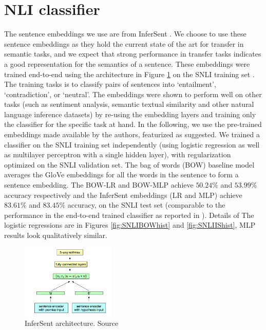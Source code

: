 \documentclass[10pt,letterpaper]{article}
\begin{document}
\section{NLI classifier}
The sentence embeddings we use are from InferSent \citep{Conneau:2017uf}. We choose to use these sentence embeddings as they hold the current state of the art for transfer in semantic tasks, and we expect that strong performance in transfer tasks indicates a good representation for the semantics of a sentence. These embeddings were trained end-to-end using the architecture in Figure \ref{fig:arch} on the SNLI training set \citep{snli:emnlp2015}. The training tasks is to classify pairs of sentences into `entailment', `contradiction', or `neutral'. The embeddings were shown to perform well on other tasks (such as sentiment analysis, semantic textual similarity and other natural language inference datasets) by re-using the embedding layers and training only the classifier for the specific task at hand. In the following, we use the pre-trained embeddings made available by the authors, featurized as suggested. We trained a classifier on the SNLI training set independently (using logistic regression as well as multilayer perceptron with a single hidden layer), with regularization optimized on the SNLI validation set. The bag of words (BOW) baseline model averages the GloVe embeddings for all the words in the sentence to form a sentence embedding. The BOW-LR and BOW-MLP achieve $50.24\%$ and $53.99\%$ accuracy respectively and the InferSent embeddings (LR and MLP) achieve $83.61\%$ and $83.45\%$ accuracy, on the SNLI test set (comparable to the performance in the end-to-end trained classifier as reported in \cite{Conneau:2017uf}). Details of The logistic regressions are in Figures \ref{fig:SNLIBOWhist} and \ref{fig:SNLIIShist}, MLP results look qualitatively similar.

\begin{figure}[ht!]
\centering
\includegraphics[width=0.4\textwidth]{InferSent_arch.png}
\caption{InferSent architecture. Source \citet{Conneau:2017uf}}
\label{fig:arch}
\end{figure}
\end{document}
